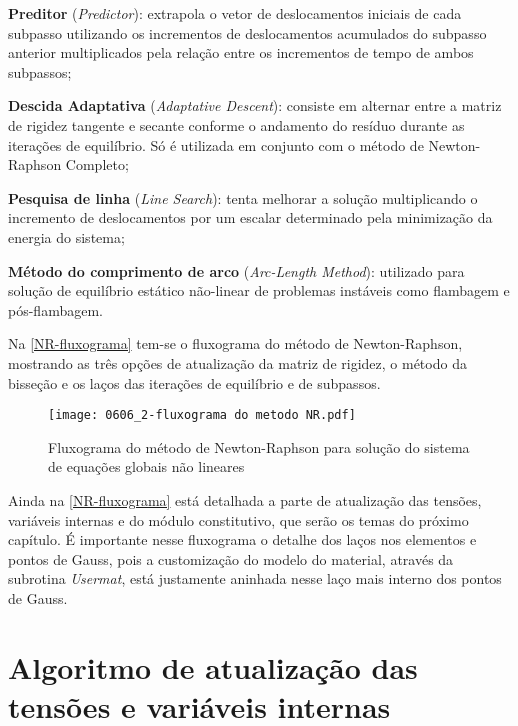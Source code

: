 \begin{alineas}
	\item \textbf{Preditor} (\textit{Predictor}): extrapola o vetor de deslocamentos iniciais de cada subpasso utilizando os incrementos de deslocamentos acumulados do subpasso anterior multiplicados pela relação entre os incrementos de tempo de ambos subpassos;
	
	\item \textbf{Descida Adaptativa} (\textit{Adaptative Descent}): consiste em alternar entre a matriz de rigidez tangente e secante conforme o andamento do resíduo durante as iterações de equilíbrio. Só é utilizada em conjunto com o método de Newton-Raphson Completo;
	
	\item \textbf{Pesquisa de linha} (\textit{Line Search}): tenta melhorar a solução multiplicando o incremento de deslocamentos por um escalar determinado pela minimização da energia do sistema;
	
	\item \textbf{Método do comprimento de arco} (\textit{Arc-Length Method}): utilizado para solução de equilíbrio estático não-linear de problemas instáveis como flambagem e pós-flambagem.	
\end{alineas}

Na \autoref{NR-fluxograma} tem-se o fluxograma do método de Newton-Raphson, mostrando as três opções de atualização da matriz de rigidez, o método da bisseção e os laços das iterações de equilíbrio e de subpassos.
\begin{figure}[H]
	\begin{center}
		\texttt{[image: 0606\_2-fluxograma do metodo NR.pdf]}
	\end{center}
	\caption{\label{NR-fluxograma}Fluxograma do método de Newton-Raphson para solução do sistema de equações globais não lineares}
\end{figure}
Ainda na \autoref{NR-fluxograma} está detalhada a parte de atualização das tensões, variáveis internas e do módulo constitutivo, que serão os temas do próximo capítulo. É importante nesse fluxograma o detalhe dos laços nos elementos e pontos de Gauss, pois a customização do modelo do material, através da subrotina \textit{Usermat}, está justamente aninhada nesse laço mais interno dos pontos de Gauss.

\section{Algoritmo de atualização das tensões e variáveis internas}


